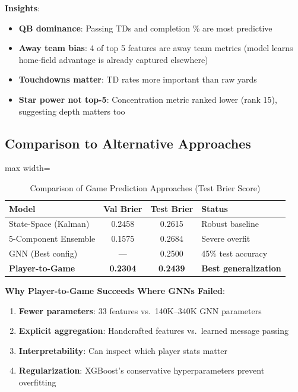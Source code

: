 \textbf{Insights}:
\begin{itemize}
    \item \textbf{QB dominance}: Passing TDs and completion \% are most predictive
    \item \textbf{Away team bias}: 4 of top 5 features are away team metrics (model learns home-field advantage is already captured elsewhere)
    \item \textbf{Touchdowns matter}: TD rates more important than raw yards
    \item \textbf{Star power not top-5}: Concentration metric ranked lower (rank 15), suggesting depth matters too
\end{itemize}

\subsection{Comparison to Alternative Approaches}
\label{sec:gnn-failure}  %

\begin{table}[htbp]
\centering
\caption{Comparison of Game Prediction Approaches (Test Brier Score)}
\label{tab:approach-comparison}
\begin{adjustbox}{max width=\textwidth}
\begin{tabular}{lccl}
\toprule
\textbf{Model} & \textbf{Val Brier} & \textbf{Test Brier} & \textbf{Status} \\
\midrule
State-Space (Kalman) & 0.2458 & 0.2615 & Robust baseline \\
5-Component Ensemble & 0.1575 & 0.2684 & Severe overfit \\
GNN (Best config) & --- & 0.2500 & 45\% test accuracy \\
\textbf{Player-to-Game} & \textbf{0.2304} & \textbf{0.2439} & \textbf{Best generalization} \\
\bottomrule
\end{tabular}
\end{adjustbox}
\end{table}

\textbf{Why Player-to-Game Succeeds Where GNNs Failed}:

\begin{enumerate}
    \item \textbf{Fewer parameters}: 33 features vs.\ 140K--340K GNN parameters
    \item \textbf{Explicit aggregation}: Handcrafted features vs.\ learned message passing
    \item \textbf{Interpretability}: Can inspect which player stats matter
    \item \textbf{Regularization}: XGBoost's conservative hyperparameters prevent overfitting
\end{enumerate}

